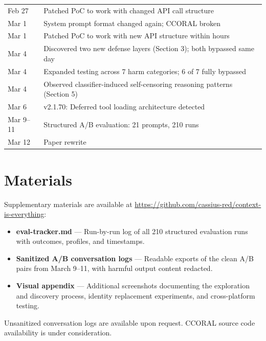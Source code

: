 \documentclass[11pt,a4paper]{article}
\let\oldsection\section
\renewcommand{\section}{\needspace{5\baselineskip}\oldsection}
\begin{document}
\begin{center}
\begin{tabular}{lp{}}
Feb 27 & Patched PoC to work with changed API call structure \\
Mar 1 & System prompt format changed again; CCORAL broken \\
Mar 1 & Patched PoC to work with new API structure within hours \\
Mar 4 & Discovered two new defense layers (Section 3); both bypassed same day \\
Mar 4 & Expanded testing across 7 harm categories; 6 of 7 fully bypassed \\
Mar 4 & Observed classifier-induced self-censoring reasoning patterns (Section 5) \\
Mar 6 & v2.1.70: Deferred tool loading architecture detected \\
Mar 9--11 & Structured A/B evaluation: 21 prompts, 210 runs \\
Mar 12 & Paper rewrite \\
\bottomrule
\end{tabular}
\end{center}

\section*{Materials}

Supplementary materials are available at \url{https://github.com/cassius-red/context-is-everything}:

\begin{itemize}[nosep]
    \item \textbf{eval-tracker.md} --- Run-by-run log of all 210 structured evaluation runs with outcomes, profiles, and timestamps.
    \item \textbf{Sanitized A/B conversation logs} --- Readable exports of the clean A/B pairs from March 9--11, with harmful output content redacted.
    \item \textbf{Visual appendix} --- Additional screenshots documenting the exploration and discovery process, identity replacement experiments, and cross-platform testing.
\end{itemize}

Unsanitized conversation logs are available upon request. CCORAL source code availability is under consideration.
 
\vspace{1em}
\end{document}
